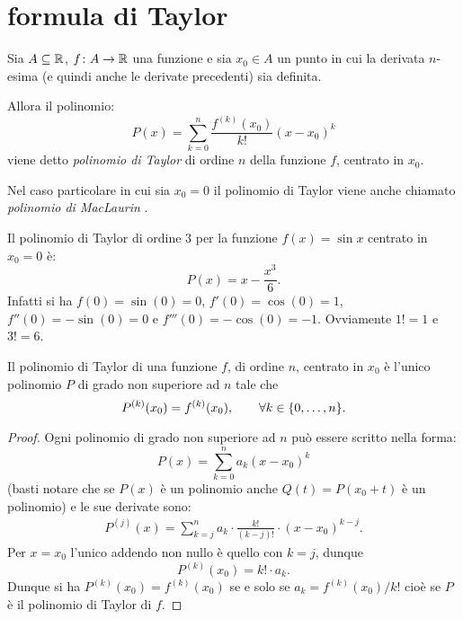 \section{formula di Taylor}


\begin{definition}
\mymark{***}
Sia $A\subseteq {\mathbb R}$, $f\colon A \to {\mathbb R}$ una funzione
e sia $x_0\in A$ un punto in cui la derivata $n$-esima
(e quindi anche le derivate precedenti) sia definita.

Allora il polinomio:
\[
  P(x) = \sum_{k=0}^n \frac{f^{(k)}(x_0)}{k!}(x-x_0)^k
\]
viene detto \emph{polinomio di Taylor}%
%
di ordine $n$
della funzione $f$,
centrato in $x_0$.
\end{definition}

Nel caso particolare in cui sia $x_0=0$ il polinomio di Taylor viene anche chiamato \emph{polinomio di MacLaurin}%
%
.

\begin{example}
  Il polinomio di Taylor di ordine $3$ per la funzione $f(x) = \sin x$ 
  centrato in $x_0=0$ è:
  \[
    P(x) = x - \frac{x^3}{6}.
  \]
  Infatti si ha $f(0) = \sin(0) = 0$, $f'(0) = \cos(0) = 1$, 
  $f''(0) = -\sin(0) = 0$ e $f'''(0) = -\cos(0) = -1$.
  Ovviamente $1!=1$ e $3!=6$. 
\end{example}

\begin{theorem}%
\label{th:caratterizzazioneTaylor}%
\mymark{***}%
Il polinomio di Taylor di una funzione $f$, di ordine $n$, centrato in $x_0$ è l'unico polinomio $P$ di grado non superiore ad $n$ tale che
\[
  P^{(k)}(x_0) = f^{(k)}(x_0), \qquad \forall k \in {\left\{ 0,\dots,n \right\}}.
\]
\end{theorem}
%
\begin{proof}
  Ogni polinomio di grado non superiore ad $n$ può essere scritto nella forma:
\[
  P(x) = \sum_{k=0}^{n} a_k (x-x_0)^k
\]
(basti notare che se $P(x)$ è un polinomio anche $Q(t) = P(x_0+t)$ è
un polinomio)
e le sue derivate sono:
\begin{align*}
   P^{(j)}(x)
   = \sum_{k=j}^n a_k \cdot \frac{k!}{(k-j)!}\cdot (x-x_0)^{k-j}.
\end{align*}
Per $x=x_0$ l'unico addendo non nullo è quello con $k=j$, dunque
\[
  P^{(k)}(x_0) = k! \cdot a_k.
\]
Dunque si ha $P^{(k)}(x_0) = f^{(k)}(x_0)$ se e solo se $a_k = f^{(k)}(x_0)/k!$ 
cioè se $P$ è il polinomio di Taylor di $f$.
\end{proof}

